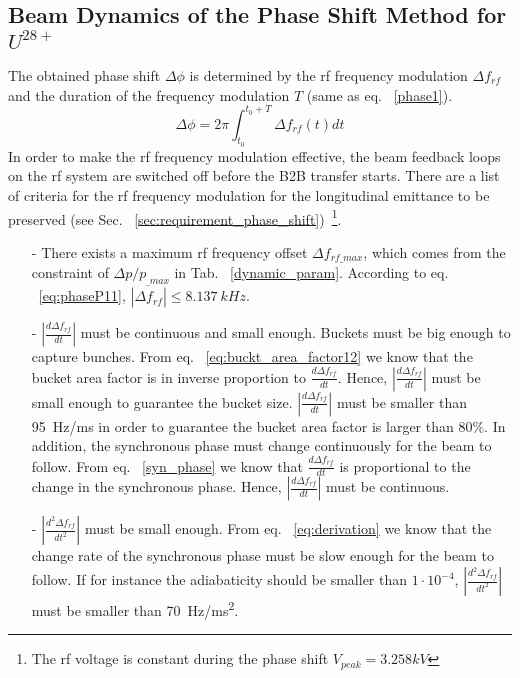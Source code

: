 \subsection{Beam Dynamics of the Phase Shift Method for $U^\mathit{28+}$}
The obtained phase shift $\Delta \phi$ is determined by the rf frequency modulation $\Delta f_{rf}$ and the duration of the frequency modulation $T$ (same as eq. ~\ref{phase1}). 
\begin{equation}
\Delta \phi= 2\pi \int_{t_0}^{t_0+T} \Delta f_{rf}(t)dt \label{phase_integration}
\end{equation}
In order to make the rf frequency modulation effective, the beam feedback loops on the rf system are switched off before the B2B transfer starts. There are a list of criteria for the rf frequency modulation for the longitudinal emittance to be preserved (see Sec. ~\ref{sec:requirement_phase_shift})~\footnote{The rf voltage is constant during the phase shift $V_{peak}=3.258kV$}.
\begin{itemize}
\item[-]
There exists a maximum rf frequency offset $\Delta f_\mathit{rf\_max}$, which comes from the constraint of $\Delta p/p_\mathit{\_max}$ in Tab. ~\ref{dynamic_param}. According to eq. ~\ref{eq:phaseP11}, $|\Delta f_\mathit{rf}| \le \SI{8.137}{kHz}$.
\item[-]
$|\frac{d\Delta f_{\mathit{rf}}}{dt}|$ must be continuous and small enough. Buckets must be big enough to capture bunches. From eq. ~\ref{eq:buckt_area_factor12} we know that the bucket area factor is in inverse proportion to $\frac{d\Delta f_{\mathit{rf}}}{dt}$. Hence, $|\frac{d\Delta f_{\mathit{rf}}}{dt}|$ must be small enough to guarantee the bucket size. $|\frac{d\Delta f_{\mathit{rf}}}{dt}|$ must be smaller than \SI{95}{Hz/ms} in order to guarantee the bucket area factor is larger than $80\%$. In addition, the synchronous phase must change continuously for the beam to follow. From eq. ~\ref{syn_phase} we know that $\frac{d\Delta f_{\mathit{rf}}}{dt}$ is proportional to the change in the synchronous phase. Hence, $|\frac{d\Delta f_{\mathit{rf}}}{dt}|$ must be continuous.
\item[-]
$|\frac{d^2\Delta f_{\mathit{rf}}}{dt^2}|$ must be small enough. From eq. ~\ref{eq:derivation} we know that the change rate of the synchronous phase must be slow enough for the beam to follow. If for instance the adiabaticity should be smaller than $1\cdot10^{-4}$, $|\frac{d^2\Delta f_{\mathit{rf}}}{dt^2}|$ must be smaller than \SI{70}{Hz/ms^2}.
\end{itemize}

